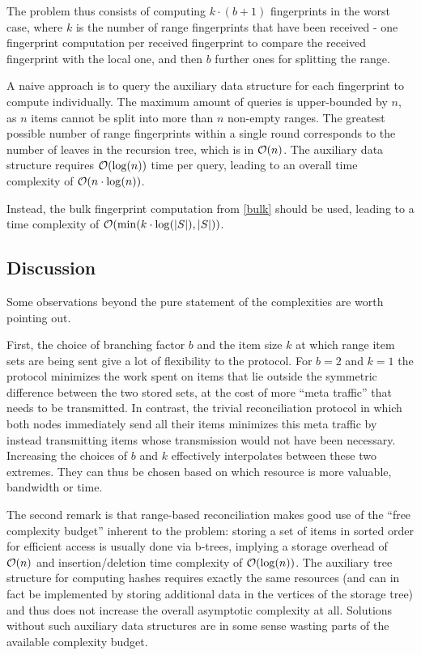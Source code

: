 The problem thus consists of computing $k \cdot (b + 1)$ fingerprints in the worst case, where $k$ is the number of range fingerprints that have been received - one fingerprint computation per received fingerprint to compare the received fingerprint with the local one, and then $b$ further ones for splitting the range.

A naive approach is to query the auxiliary data structure for each fingerprint to compute individually. The maximum amount of queries is upper-bounded by $n$, as $n$ items cannot be split into more than $n$ non-empty ranges. The greatest possible number of range fingerprints within a single round corresponds to the number of leaves in the recursion tree, which is in $\mathcal{O}(n)$. The auxiliary data structure requires $\mathcal{O}(\log(n))$ time per query, leading to an overall time complexity of $\mathcal{O}(n \cdot \log(n))$.

Instead, the bulk fingerprint computation from \cref{bulk} should be used, leading to a time complexity of $\mathcal{O}(\min(k \cdot \log(|{S}|), |{S}|))$.

\subsection{Discussion}

Some observations beyond the pure statement of the complexities are worth pointing out.

First, the choice of branching factor $b$ and the item size $k$ at which range item sets are being sent give a lot of flexibility to the protocol. For $b = 2$ and $k = 1$ the protocol minimizes the work spent on items that lie outside the symmetric difference between the two stored sets, at the cost of more ``meta traffic'' that needs to be transmitted. In contrast, the trivial reconciliation protocol in which both nodes immediately send all their items minimizes this meta traffic by instead transmitting items whose transmission would not have been necessary. Increasing the choices of $b$ and $k$ effectively interpolates between these two extremes. They can thus be chosen based on which resource is more valuable, bandwidth or time.

The second remark is that range-based reconciliation makes good use of the ``free complexity budget'' inherent to the problem: storing a set of items in sorted order for efficient access is usually done via b-trees, implying a storage overhead of $\mathcal{O}(n)$ and insertion/deletion time complexity of $\mathcal{O}(\log(n))$. The auxiliary tree structure for computing hashes requires exactly the same resources (and can in fact be implemented by storing additional data in the vertices of the storage tree) and thus does not increase the overall asymptotic complexity at all. Solutions without such auxiliary data structures are in some sense wasting parts of the available complexity budget.

